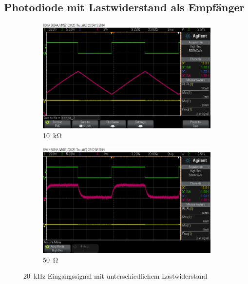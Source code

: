 \documentclass[12pt,a4paper]{article}
\begin{document}
\subsection{Photodiode mit Lastwiderstand als Empfänger}
\label{sec:direct_rx}

\begin{figure}[H]
  \centering
  \begin{subfigure}[b]{0.6\textwidth}
    \includegraphics[width=\textwidth]{../measurements/20140703/20kHz_10kOhm/scope_2.png}
    \caption{\SI{10}{\kilo\ohm}}
    \label{fig:direct_rx_10k_R}
  \end{subfigure}  
  \begin{subfigure}[b]{0.6\textwidth}
    \includegraphics[width=\textwidth]{../measurements/20140703/20kHz_50_Ohm/scope_0.png}
    \caption{\SI{50}{\ohm}}
    \label{fig:direct_rx_50_R}
  \end{subfigure}  
  \caption{\SI{20}{\kilo\hertz} Eingangssignal mit unterschiedlichem Lastwiderstand}
  \label{fig:direct_rx}
\end{figure}
\end{document}
